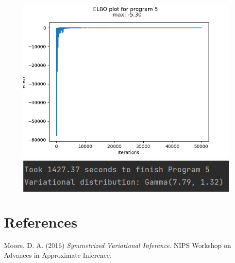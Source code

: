 \documentclass[10pt]{homeworg}
\begin{document}
\begin{figure}[!htbp]
    \centering
    \begin{minipage}{0.5\textwidth}
        \centering
       \includegraphics[scale=0.5]{figures/elbo_program_5.png}
    \end{minipage}\hfill
    \begin{minipage}{0.5\textwidth}
        \centering
        \includegraphics[scale=0.8]{figures/program5_time.png}
    \end{minipage}
\end{figure}

\section*{References}
Moore, D. A. (2016) \textit{Symmetrized Variational Inference}. NIPS Workshop on Advances in Approximate Inference.
\end{document}
